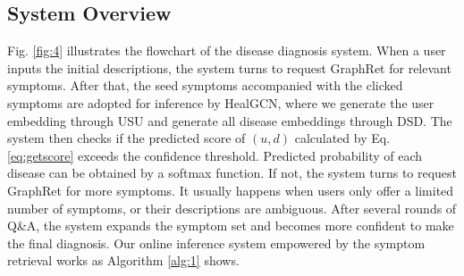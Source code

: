\documentclass[sigconf]{acmart}
\begin{document}
\subsection{System Overview}
Fig. \ref{fig:4} illustrates the flowchart of the disease diagnosis system. When a user inputs the initial descriptions, the system turns to request GraphRet for relevant symptoms. After that, the seed symptoms accompanied with the clicked symptoms are adopted for inference by HealGCN, where we generate the user embedding through USU and generate all disease embeddings through DSD. The system then checks if the predicted score of $(u,d)$ calculated by Eq. \eqref{eq:getscore} exceeds the confidence threshold. Predicted probability of each disease can be obtained by a softmax function. If not, the system turns to request GraphRet for more symptoms. It usually happens when users only offer a limited number of symptoms, or their descriptions are ambiguous. After several rounds of Q\&A, the system expands the symptom set and becomes more confident to make the final diagnosis. Our online inference system empowered by the symptom retrieval works as Algorithm \ref{alg:1} shows.
\end{document}
